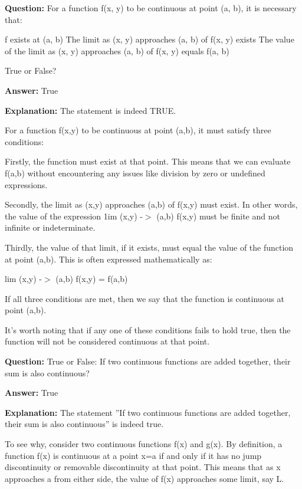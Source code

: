\documentclass{article}
\begin{document}
                \vspace{0.5cm} 
        
            
                \textbf {Question:} For a function f(x, y) to be continuous at point (a, b), it is necessary that:

f exists at (a, b)
The limit as (x, y) approaches (a, b) of f(x, y) exists
The value of the limit as (x, y) approaches (a, b) of f(x, y) equals f(a, b)

True or False?
                
                \textbf{Answer:} True

                \textbf{Explanation:} The statement is indeed TRUE.

For a function f(x,y) to be continuous at point (a,b), it must satisfy three conditions:

Firstly, the function must exist at that point. This means that we can evaluate f(a,b) without encountering any issues like division by zero or undefined expressions.

Secondly, the limit as (x,y) approaches (a,b) of f(x,y) must exist. In other words, the value of the expression 1im (x,y) -\ensuremath{>} (a,b) f(x,y) must be finite and not infinite or indeterminate.

Thirdly, the value of that limit, if it exists, must equal the value of the function at point (a,b). This is often expressed mathematically as: 

lim (x,y) -\ensuremath{>} (a,b) f(x,y) = f(a,b)

If all three conditions are met, then we say that the function is continuous at point (a,b).

It's worth noting that if any one of these conditions fails to hold true, then the function will not be considered continuous at that point.
                
                \vspace{0.5cm} 
        
            
                \textbf {Question:} True or False: If two continuous functions are added together, their sum is also continuous?
                
                \textbf{Answer:} True

                \textbf{Explanation:} The statement ''If two continuous functions are added together, their sum is also continuous'' is indeed true.

To see why, consider two continuous functions f(x) and g(x). By definition, a function f(x) is continuous at a point x=a if and only if it has no jump discontinuity or removable discontinuity at that point. This means that as x approaches a from either side, the value of f(x) approaches some limit, say L.
\end{document}
